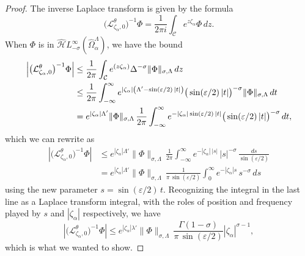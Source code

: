 \documentclass{article}
\let\Re\relax
\DeclareMathOperator{\Re}{Re}
\newcommand{\dualsingexp}[1]{\widehat{\mathcal{H}}L^\infty_{#1}}
\newcommand{\laplace}{\mathcal{L}}
\theoremstyle{definition}
\theoremstyle{plain}
\begin{document}
\begin{proof}
The inverse Laplace transform is given by the formula
\[ \big(\laplace_{\zeta_\alpha, 0}^\theta\big)^{-1} \Phi = \frac{1}{2 \pi i} \int_{\mathcal{C}} e^{z\zeta_\alpha} \Phi\,dz. \]
When $\Phi$ is in $\dualsingexp{-\sigma}(\widehat{\Omega}_\alpha^\Lambda)$, we have the bound
\begin{align*}
\left|\big(\laplace_{\zeta_\alpha, 0}^\theta\big)^{-1} \Phi\right| & \le \frac{1}{2 \pi} \int_{\mathcal{C}} e^{\Re(z\zeta_\alpha)} \Delta^{-\sigma} \|\Phi\|_{\sigma, \Lambda}\,dz \\
& \le \frac{1}{2 \pi} \int_{-\infty}^\infty e^{|\zeta_\alpha| \left(\Lambda' - \sin(\varepsilon/2)\,|t|\right)} \big(\sin(\varepsilon/2)\,|t|\big)^{-\sigma} \|\Phi\|_{\sigma, \Lambda}\,dt \\
& = e^{|\zeta_\alpha| \Lambda'} \|\Phi\|_{\sigma, \Lambda}\,\frac{1}{2 \pi} \int_{-\infty}^\infty e^{-|\zeta_\alpha| \sin(\varepsilon/2)\,|t|} \big(\sin(\varepsilon/2)\,|t|\big)^{-\sigma}\,dt,
\end{align*}
which we can rewrite as
\begin{align*}
\left|\big(\laplace_{\zeta_\alpha, 0}^\theta\big)^{-1} \Phi\right| & \le e^{|\zeta_\alpha| \Lambda'} \|\Phi\|_{\sigma, \Lambda}\,\frac{1}{2 \pi} \int_{-\infty}^\infty e^{-|\zeta_\alpha| \,|s|}\,|s|^{-\sigma}\,\frac{ds}{\sin(\varepsilon/2)} \\
& = e^{|\zeta_\alpha| \Lambda'} \|\Phi\|_{\sigma, \Lambda}\,\frac{1}{\pi\,\sin(\varepsilon/2)} \int_0^\infty e^{-|\zeta_\alpha|s}\,s^{-\sigma}\,ds
\end{align*}
using the new parameter $s = \sin(\varepsilon/2)\,t$. Recognizing the integral in the last line as a Laplace transform integral, with the roles of position and frequency played by $s$ and $|\zeta_\alpha|$ respectively, we have
\[ \left|\big(\laplace_{\zeta_\alpha, 0}^\theta\big)^{-1} \Phi\right| \le e^{|\zeta_\alpha| \lambda'} \|\Phi\|_{\sigma, \Lambda}\,\frac{\Gamma(1-\sigma)}{\pi\,\sin(\varepsilon/2)} |\zeta_\alpha|^{\sigma-1}, \]
which is what we wanted to show.
\end{proof}
%
\end{document}

